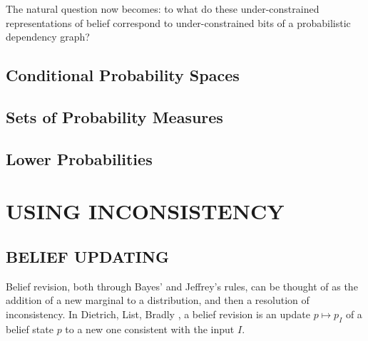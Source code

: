\documentclass{article}
\newcommand{\modelname}{probabilistic dependency graph}
\numberwithin{equation}{section}
\begin{document}
\begin{notfocus}
\begin{vfull}
		\begin{center}
		\end{center}
		
	
		The natural question now becomes: to what do these under-constrained representations of belief correspond to under-constrained bits of a \modelname?
		
		\subsection{Conditional Probability Spaces}
		
		\begin{center}
		\end{center}
		
	
		
	
		\subsection{Sets of Probability Measures}
	
	
		
		\subsection{Lower Probabilities}
	\end{vfull}


	\section{USING INCONSISTENCY}	
	\subsection{BELIEF UPDATING} \label{sec:belief-update}
	Belief revision, both through Bayes' and Jeffrey's rules, can be thought of as the addition of a new marginal to a distribution, and then a resolution of inconsistency. In Dietrich, List, Bradly \cite{dietrich2016belief}, a belief revision is an update $p \mapsto p_I$ of a belief state $p$ to a new one consistent with the input $I$. 
	

\end{notfocus}
\end{document}
